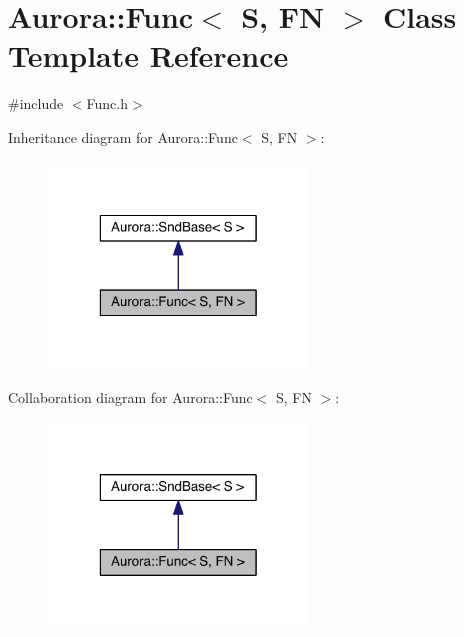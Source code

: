 \hypertarget{class_aurora_1_1_func}{}\section{Aurora\+:\+:Func$<$ S, FN $>$ Class Template Reference}
\label{class_aurora_1_1_func}


{\ttfamily \#include $<$Func.\+h$>$}



Inheritance diagram for Aurora\+:\+:Func$<$ S, FN $>$\+:\nopagebreak
\begin{figure}[H]
\begin{center}
\leavevmode
\includegraphics[width=196pt]{class_aurora_1_1_func__inherit__graph}
\end{center}
\end{figure}


Collaboration diagram for Aurora\+:\+:Func$<$ S, FN $>$\+:\nopagebreak
\begin{figure}[H]
\begin{center}
\leavevmode
\includegraphics[width=196pt]{class_aurora_1_1_func__coll__graph}
\end{center}
\end{figure}
